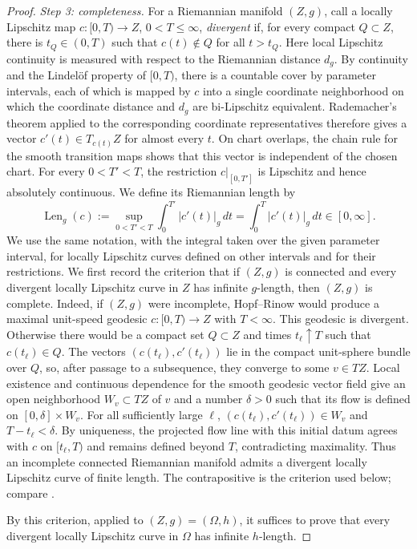 \documentclass[12pt,oneside,a4paper]{article}
\theoremstyle{mytheorem}
\theoremstyle{remark}
\theoremstyle{definition}
\begin{document}
\begin{proof}
\smallskip\noindent
\emph{Step 3: completeness.}
For a Riemannian manifold $(Z,g)$, call a locally Lipschitz map
$c:[0,T)\to Z$, $0<T\le\infty$, \emph{divergent} if, for every compact
$Q\subset Z$, there is
$t_Q\in(0,T)$ such that $c(t)\notin Q$ for all $t>t_Q$.  Here local
Lipschitz continuity is measured with respect to the Riemannian
distance $d_g$.  By continuity and the Lindel\"of property of
$[0,T)$, there is a countable cover by parameter intervals, each of
which is mapped by $c$ into a single coordinate neighborhood on which
the coordinate distance and $d_g$ are bi-Lipschitz equivalent.
Rademacher's theorem applied to the corresponding coordinate
representatives therefore gives a vector $c'(t)\in T_{c(t)}Z$ for
almost every $t$.  On chart overlaps, the chain rule for the smooth
transition maps shows that this vector is independent of the chosen
chart.  For every $0<T'<T$, the restriction $c|_{[0,T']}$ is
Lipschitz and hence absolutely continuous.  We define its Riemannian
length by
\[
 \operatorname{Len}_g(c)
 :=\sup_{0<T'<T}\int_0^{T'}|c'(t)|_g\,dt
 =\int_0^T|c'(t)|_g\,dt\in[0,\infty].
\]
We use the same notation, with the integral taken over the given
parameter interval, for locally Lipschitz curves defined on other
intervals and for their restrictions.
We first record the
criterion that if $(Z,g)$ is connected and every divergent locally
Lipschitz curve in $Z$ has infinite $g$-length, then $(Z,g)$ is complete.
Indeed, if $(Z,g)$ were incomplete, Hopf--Rinow would produce a maximal
unit-speed geodesic $c:[0,T)\to Z$ with $T<\infty$.  This geodesic is
divergent.  Otherwise there would be a compact set $Q\subset Z$ and
times $t_\ell\uparrow T$ such that $c(t_\ell)\in Q$.  The vectors
$(c(t_\ell),c'(t_\ell))$ lie in the compact
unit-sphere bundle over $Q$, so, after passage to a subsequence, they
converge to some $v\in TZ$.  Local existence and continuous dependence
for the smooth geodesic vector field give an open neighborhood
$W_v\subset TZ$ of $v$ and a number $\delta>0$ such that its flow is
defined on $[0,\delta]\times W_v$.  For all sufficiently large $\ell$,
$(c(t_\ell),c'(t_\ell))\in W_v$ and $T-t_\ell<\delta$.  By uniqueness, the
projected flow line with this initial datum agrees with $c$ on
$[t_\ell,T)$ and remains defined beyond $T$, contradicting maximality.
Thus an incomplete connected Riemannian manifold admits a divergent
locally Lipschitz curve of finite length.  The contrapositive is the
criterion used below; compare \cite[Theorem~2.3]{zbMATH07873599}.

By this criterion, applied to $(Z,g)=(\Omega,h)$, it suffices to prove that
every divergent locally Lipschitz curve in $\Omega$ has infinite
$h$-length.


\end{proof}
\end{document}
